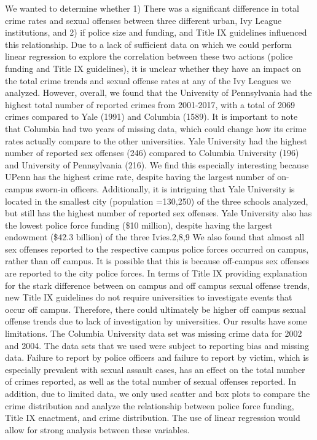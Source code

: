 \documentclass[
]{article}
\begin{document}
We wanted to determine whether 1) There was a significant difference in
total crime rates and sexual offenses between three different urban, Ivy
League institutions, and 2) if police size and funding, and Title IX
guidelines influenced this relationship. Due to a lack of sufficient
data on which we could perform linear regression to explore the
correlation between these two actions (police funding and Title IX
guidelines), it is unclear whether they have an impact on the total
crime trends and sexual offense rates at any of the Ivy Leagues we
analyzed. However, overall, we found that the University of Pennsylvania
had the highest total number of reported crimes from 2001-2017, with a
total of 2069 crimes compared to Yale (1991) and Columbia (1589). It is
important to note that Columbia had two years of missing data, which
could change how its crime rates actually compare to the other
universities. Yale University had the highest number of reported sex
offenses (246) compared to Columbia University (196) and University of
Pennsylvania (216). We find this especially interesting because UPenn
has the highest crime rate, despite having the largest number of
on-campus sworn-in officers. Additionally, it is intriguing that Yale
University is located in the smallest city (population =130,250) of the
three schools analyzed, but still has the highest number of reported sex
offenses. Yale University also has the lowest police force funding (\$10
million), despite having the largest endowment (\$42.3 billion) of the
three Ivies.2,8,9 We also found that almost all sex offenses reported to
the respective campus police forces occurred on campus, rather than off
campus. It is possible that this is because off-campus sex offenses are
reported to the city police forces. In terms of Title IX providing
explanation for the stark difference between on campus and off campus
sexual offense trends, new Title IX guidelines do not require
universities to investigate events that occur off campus. Therefore,
there could ultimately be higher off campus sexual offense trends due to
lack of investigation by universities. Our results have some
limitations. The Columbia University data set was missing crime data for
2002 and 2004. The data sets that we used were subject to reporting bias
and missing data. Failure to report by police officers and failure to
report by victim, which is especially prevalent with sexual assault
cases, has an effect on the total number of crimes reported, as well as
the total number of sexual offenses reported. In addition, due to
limited data, we only used scatter and box plots to compare the crime
distribution and analyze the relationship between police force funding,
Title IX enactment, and crime distribution. The use of linear regression
would allow for strong analysis between these variables.
\end{document}
